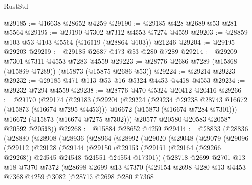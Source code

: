 \begin{lexlean}{RustStd}
\begin{coremodule}
@29185 := @16638 @28652 @4259
@29190 := @29185 @428 @2689 @53 @281 @5564
@29195 := @29190 @7302 @7312 @4553 @7274 @4559
@29203 := @28859 @103 @53 @103 @5564 (@16019 (@28864 @103)) @21246
@29204 := @29195 @29203
@29209 := @29185 @2687 @473 @53 @280 @7289
@29214 := @29209 @7301 @7311 @4553 @7283 @4559
@29223 := @28776 @2686 @7289 (@15868 (@15869 @7289)) (@15873 (@15875 @2686 @53))
@29224 := @29214 @29223
@29232 := @29185 @471 @113 @53 @16 @5324 @4453 @4468 @4553
@29234 := @29232 @7294 @4559
@29238 := @28776 @470 @5324 @20412 @20416
@29266 := @29170
    (@29174
      (@29183
        (@29204
          (@29224
            (@29234 @29238 @28743 @16672 (@15873 (@16674 @7295 @4453)))
            @16672
            (@15873 (@16674 @7284 @7301)))
          @16672
          (@15873 (@16674 @7275 @7302)))
        @20577
        @20580
        @20583
        @20587
        @20592
        @20598))
@29268 := @15884 @28652 @4259
@29414 := @28833
    (@28836
      (@28880
        (@28908
          (@28936
            (@28964
              (@28992
                (@29020
                  (@29048
                    (@29079
                      (@29096
                        (@29112
                          (@29128
                            (@29144
                              (@29150
                                (@29153
                                  (@29161
                                    (@29164 (@29266 @29268))
                                    @24545
                                    @24548
                                    @24551
                                    @24554
                                    @17301))
                                (@28718
                                  @2699
                                  @2701
                                  @13
                                  @18
                                  @7370
                                  @7372
                                  (@28698
                                    @2699
                                    @13
                                    @7370
                                    (@29154
                                      @2698
                                      @280
                                      @13
                                      @4453
                                      @7368
                                      @4259
                                      @3082
                                      (@28713
                                        @2698
                                        @280
                                        @7368

\end{coremodule}
\end{lexlean}

